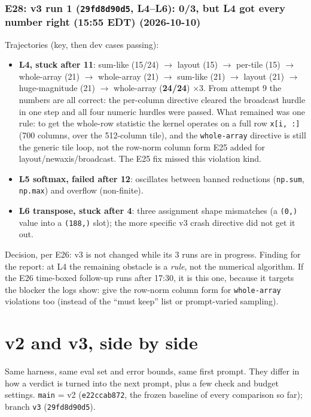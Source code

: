 \documentclass[11pt]{article}
\newcommand{\code}[1]{\texttt{#1}}
\newcommand{\entry}[2]{\subsubsection*{#1 \textnormal{\small(#2)}}}
\begin{document}
\entry{E28: v3 run 1 (\code{29fd8d90d5}, L4--L6): 0/3, but L4 got every number right (15:55 EDT)}{2026-10-10}
Trajectories (key, then dev cases passing):
\begin{itemize}
  \item \textbf{L4, stuck after 11}: sum-like (15/24) $\to$ layout (15) $\to$ per-tile (15) $\to$
        whole-array (21) $\to$ whole-array (21) $\to$ sum-like (21) $\to$ layout (21) $\to$ huge-magnitude
        (21) $\to$ whole-array (\textbf{24/24}) $\times3$. From attempt 9 the numbers are all correct:
        the per-column directive cleared the broadcast hurdle in one step and all four numeric hurdles
        were passed. What remained was one rule: to get the whole-row statistic the kernel operates on a
        full row \code{x[i, :]} (700 columns, over the 512-column tile), and the \code{whole-array}
        directive is still the generic tile loop, not the row-norm column form E25 added for
        layout/newaxis/broadcast. The E25 fix missed this violation kind.
  \item \textbf{L5 softmax, failed after 12}: oscillates between banned reductions (\code{np.sum},
        \code{np.max}) and overflow (non-finite).
  \item \textbf{L6 transpose, stuck after 4}: three assignment shape mismatches (a \code{(0,)} value into a
        \code{(188,)} slot); the more specific v3 crash directive did not get it out.
\end{itemize}
Decision, per E26: v3 is not changed while its 3 runs are in progress. Finding for the report: at L4 the
remaining obstacle is a \emph{rule}, not the numerical algorithm. If the E26 time-boxed follow-up runs
after 17:30, it is this one, because it targets the blocker the logs show: give the row-norm column form
for \code{whole-array} violations too (instead of the ``must keep'' list or prompt-varied sampling).

\section{v2 and v3, side by side}
\label{sec:v2v3}

Same harness, same eval set and error bounds, same first prompt. They differ in how a verdict is turned
into the next prompt, plus a few check and budget settings. \code{main} = v2 (\code{e22ccab872}, the frozen
baseline of every comparison so far); branch \code{v3} (\code{29fd8d90d5}).
\end{document}
